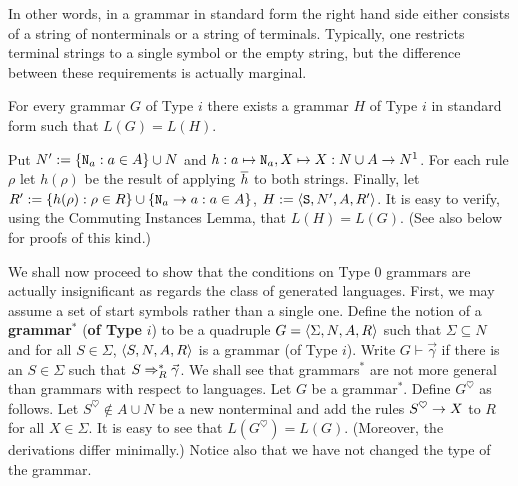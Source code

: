 In other words, in a grammar in standard form the right hand side 
either consists of a string of nonterminals or a string of terminals. 
Typically, one restricts terminal strings to a single symbol or the 
empty string, but the difference between these requirements is 
actually marginal.
\begin{lem}
For every grammar $G$ of Type $i$ there exists a grammar $H$ of
Type $i$ in standard form such that $L(G) = L(H)$.
\end{lem}
\proofbeg
Put $N' := \{\mbox{\tt N}_a : a \in A\} \cup N$ and $h :
a \mapsto \mbox{\tt N}_a, X \mapsto X : N \cup A \rightarrow N^1$.
For each rule $\rho$ let $h(\rho)$ be the result of
applying $\overline{h}$ to both strings. Finally, let
$R' := \{h(\rho) : \rho \in R\} \cup \{\mbox{\tt N}_a \rightarrow a : a
\in A\}$, $H := \langle \mbox{\tt S}, N', A, R'\rangle$. It is easy to 
verify, using the Commuting Instances 
Lemma, that $L(H) = L(G)$. (See also 
below for proofs of this kind.) 
\proofend

We shall now proceed to show that the conditions on Type 0 grammars
are actually insignificant as regards the class of generated languages.
First, we may assume a set of start symbols rather than a single one.
Define the notion of a \textbf{\bf grammar}$^{\ast}$ (\textbf{of Type} 
$i$) to be a quadruple $G = \langle \Sigma, N, A, R\rangle$ such that 
$\Sigma \subseteq N$ and for all $S \in \Sigma$, $\langle S, N, A, R\rangle$ 
is a grammar (of Type $i$). Write $G \vdash \vec{\gamma}$ if there is 
an $S \in \Sigma$ such that $S \Rightarrow^{\ast}_R \vec{\gamma}$. We shall 
see that grammars$^{\ast}$
are not more general than grammars with respect to languages.
Let $G$ be a grammar$^{\ast}$. Define $G^{\heartsuit}$ as follows.
Let $S^{\heartsuit} \not\in A \cup N$ be a new nonterminal and
add the rules $S^{\heartsuit} \rightarrow X$ to $R$ for all
$X \in \Sigma$. It is easy to see that $L(G^{\heartsuit}) = L(G)$.
(Moreover, the derivations differ minimally.) Notice also that
we have not changed the type of the grammar.

